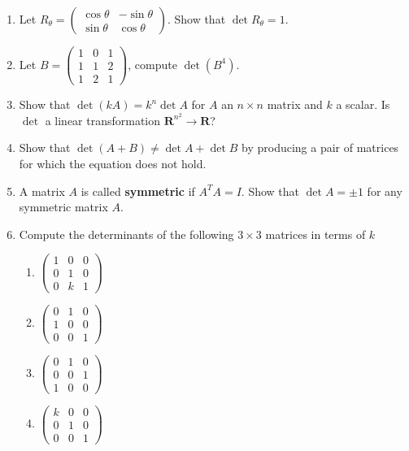 \documentclass[12pt]{article}
\numberwithin{equation}{subsection}
\numberwithin{figure}{subsection}
\theoremstyle{note}
\begin{document}
\begin{enumerate}[label=\arabic*.]
\item Let $R_{\theta}=\begin{pmatrix} \cos \theta & -\sin\theta \\ \sin \theta & \cos \theta\end{pmatrix}$. Show that $\det R_{\theta}=1$. 
\item Let $B=\begin{pmatrix} 1 & 0 & 1 \\ 1 & 1 & 2 \\ 1 & 2 & 1 \end{pmatrix}$, compute $\det(B^4)$. 
\item Show that $\det (kA)=k^n \det A$ for $A$ an $n\times n$ matrix and $k$ a scalar. Is $\det$ a linear transformation $\mathbf{R}^{n^2}\to\mathbf{R}$?

\item Show that $\det(A+B)\neq \det A+\det B$ by producing a pair of matrices for which the equation does not hold.
 
\item A matrix $A$ is called \textbf{symmetric} if $A^TA=I$. Show that $\det A=\pm 1$ for any symmetric matrix $A$.

\item Compute the determinants of the following $3\times 3$ matrices in terms of $k$
\begin{enumerate}
	\item $\begin{pmatrix} 1 & 0 & 0 \\ 0 & 1 & 0 \\ 0 & k & 1\end{pmatrix}$
	\item $\begin{pmatrix} 0 & 1 & 0 \\ 1 & 0 & 0 \\ 0 & 0 & 1\end{pmatrix}$
	\item $\begin{pmatrix} 0 & 1 & 0 \\ 0 & 0 & 1 \\ 1 & 0 & 0\end{pmatrix}$
	\item $\begin{pmatrix} k & 0 & 0 \\ 0 & 1 & 0 \\ 0 & 0  & 1\end{pmatrix}$

\end{enumerate}


\end{enumerate}
\end{document}
